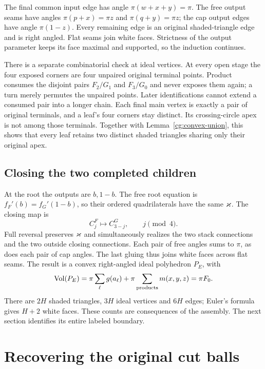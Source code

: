 The final common input edge has angle $\pi(w+x+y)=\pi$.
The free output seams have angles $\pi(p+x)=\pi z$ and
$\pi(q+y)=\pi z$; the cap output edges have angle $\pi(1-z)$.
Every remaining edge is an original shaded-triangle edge and is
right angled. Flat seams join white faces. Strictness of the
output parameter keeps its face maximal and supported, so the
induction continues.

There is a separate combinatorial check at ideal vertices.
At every open stage the four exposed corners are four unpaired
original terminal points. Product consumes the disjoint pairs
$F_2/G_1$ and $F_3/G_0$ and never exposes them again; a turn merely
permutes the unpaired points. Later identifications cannot extend
a consumed pair into a longer chain. Each final main vertex is
exactly a pair of original terminals, and a leaf's four corners
stay distinct. Its crossing-circle apex is not among those
terminals. Together with Lemma~\ref{cg:convex-union}, this shows
that every leaf retains two distinct shaded triangles sharing only
their original apex.

\subsection{Closing the two completed children}
At the root the outputs are $b,1-b$. The free root equation is
$f_F'(b)=f_G'(1-b)$, so their ordered quadrilaterals have the same
$\varkappa$. The closing map is
\begin{equation}\label{cg:root}
 C_j^F\longmapsto C_{3-j}^G,\qquad j\pmod4.
\end{equation}
Full reversal preserves $\varkappa$ and simultaneously realizes the
two stack connections and the two outside closing connections.
Each pair of free angles sums to $\pi$, as does each pair of cap
angles. The last gluing thus joins white faces across flat seams.
The result is a convex right-angled ideal polyhedron $P_E$, with
\begin{equation}\label{cg:half-volume}
 \operatorname{Vol}(P_E)=\pi\sum_\ell g(a_\ell)
             +\pi\sum_{\text{products}}m(x,y,z)=\pi F_0 .
\end{equation}
There are $2H$ shaded triangles, $3H$ ideal vertices and $6H$
edges; Euler's formula gives $H+2$ white faces. These counts are
consequences of the assembly. The next section identifies its
entire labeled boundary.

\section{Recovering the original cut balls}
\label{cg:topology}

